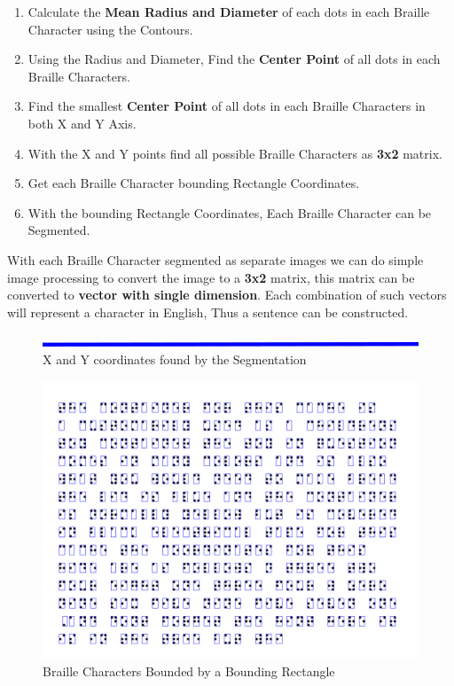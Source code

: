 \documentclass{article}
\begin{document}
\begin{enumerate}
  \item Calculate the \textbf{Mean Radius and Diameter} of each dots in each Braille Character using the Contours.
  \item Using the Radius and Diameter, Find the \textbf{Center Point} of all dots in each Braille Characters.
  \item Find the smallest \textbf{Center Point} of all dots in each Braille Characters in both X and Y Axis.
  \item With the X and Y points find all possible Braille Characters as \textbf{3x2} matrix.
  \item Get each Braille Character bounding Rectangle Coordinates.
  \item With the bounding Rectangle Coordinates, Each Braille Character can be Segmented.
\end{enumerate}

With each Braille Character segmented as separate images we can do simple image processing to convert the image to a \textbf{3x2} matrix, this matrix can be converted to \textbf{vector with single dimension}. Each combination of such vectors will represent a character in English, Thus a sentence can be constructed.


\begin{figure}[!htb]
\caption{X and Y coordinates found by the Segmentation}
\centering
\includegraphics[scale=0.4]{xy}
\end{figure}


\begin{figure}[!htb]
\caption{Braille Characters Bounded by a Bounding Rectangle}
\centering
\includegraphics[scale=0.4]{rectangle}
\end{figure}
\end{document}
